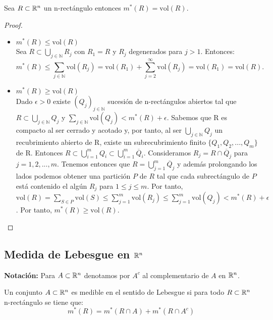 \begin{proposición}
Sea $R \subset \mathbb{R}^n$ un n-rectángulo entonces $m^*(R) = \text{vol}(R)$.
\end{proposición}

\begin{proof}
    \leavevmode
    \begin{itemize}
        \item $m^*(R) \leq \text{vol}(R)$\\
              Sea \( R \subset \bigcup_{j \in \mathbb{N}} R_j \) con \( R_1 = R \) y \( R_j \) degenerados para \( j > 1 \). Entonces:
              \[
                  m^*(R) \leq \sum_{j \in \mathbb{N}} \text{vol}(R_j) = \text{vol}(R_1) + \sum_{j=2}^{\infty} \text{vol}(R_j) = \text{vol}(R_1) = \text{vol}(R).
              \]
        \item $m^*(R) \geq \text{vol}(R)$\\
              Dado $\epsilon > 0$ existe $(Q_j)_{j \in \mathbb{N}}$ sucesión de n-rectángulos abiertos tal que $R \subset \bigcup_{j \in \mathbb{N}} Q_j$ y $\sum_{j \in \mathbb{N}} \text{vol}(Q_j) < m^*(R) + \epsilon$. Sabemos que R es compacto al ser cerrado y acotado y, por tanto, al ser $\bigcup_{j \in \mathbb{N}} Q_j$ un recubrimiento abierto de R, existe un subrecubrimiento finito $\{Q_1, Q_2, ..., Q_m\}$ de R. Entonces $R \subset \bigcup_{i=1}^m Q_i \subset \bigcup_{i = 1}^m \overline{Q}_i$. Consideramos $R_j = R \cap \overline{Q}_j$ para $j = 1, 2, ..., m$. Tenemos entonces que $R = \bigcup_{j = 1}^{m} \overline{Q}_j$ y además prolongando los lados podemos obtener una partición $P$ de $R$ tal que cada subrectángulo de $P$ está contenido el algún $R_j$ para $1 \leq j \leq m$. Por tanto, $\text{vol}(R) = \sum_{S \in P} \text{vol}(S) \leq \sum_{j = 1}^{m} \text{vol}(R_j) \leq \sum_{j = 1}^{m} \text{vol}(Q_j) < m^*(R) + \epsilon$. Por tanto, $m^*(R) \geq \text{vol}(R)$.
    \end{itemize}
\end{proof}

\subsection{Medida de Lebesgue en $\mathbb{R}^n$}

\textbf{Notación:} Para $A \subset \mathbb{R}^n$ denotamos por $A^c$ al complementario de $A$ en $\mathbb{R}^n$.

\begin{definición}
Un conjunto $A \subset \mathbb{R}^n$ es medible en el sentido de Lebesgue si para todo $R \subset \mathbb{R}^n$ n-rectángulo se tiene que:
\begin{equation}
    m^*(R) = m^*(R \cap A) + m^*(R \cap A^c)
\end{equation}
\end{definición}


